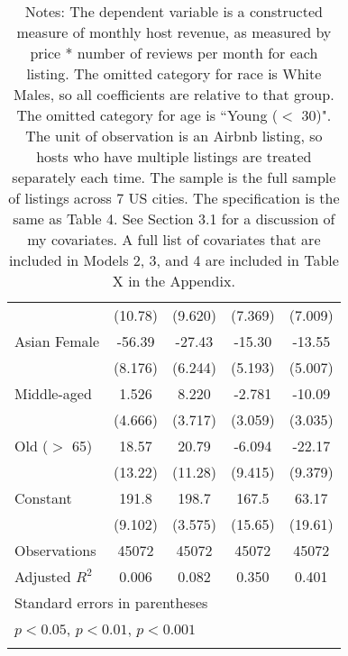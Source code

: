 {\begin{longtable}{l*{4}{c}}
                    &     (10.78)         &     (9.620)         &     (7.369)         &     (7.009)         \\
[1em]
Asian Female        &      -56.39\sym{***}&      -27.43\sym{***}&      -15.30\sym{**} &      -13.55\sym{**} \\
                    &     (8.176)         &     (6.244)         &     (5.193)         &     (5.007)         \\
[1em]
Middle-aged         &       1.526         &       8.220\sym{*}  &      -2.781         &      -10.09\sym{***}\\
                    &     (4.666)         &     (3.717)         &     (3.059)         &     (3.035)         \\
[1em]
Old ($>$ 65)                 &       18.57         &       20.79         &      -6.094         &      -22.17\sym{*}  \\
                    &     (13.22)         &     (11.28)         &     (9.415)         &     (9.379)         \\
[1em]
Constant            &       191.8\sym{***}&       198.7\sym{***}&       167.5\sym{***}&       63.17\sym{**} \\
                    &     (9.102)         &     (3.575)         &     (15.65)         &     (19.61)         \\
\hline
Observations        &       45072         &       45072         &       45072         &       45072         \\
Adjusted \(R^{2}\)  &       0.006         &       0.082         &       0.350         &       0.401         \\
\hline\hline
\multicolumn{5}{l}{\footnotesize Standard errors in parentheses}\\
\multicolumn{5}{l}{\footnotesize \sym{*} \(p<0.05\), \sym{**} \(p<0.01\), \sym{***} \(p<0.001\)}\\
\caption*{Notes: The dependent variable is a constructed measure of monthly host revenue, as measured by price * number of reviews per month for each listing. The omitted category for race is White Males, so all coefficients are relative to that group. The omitted category for age is ``Young ($<$ 30)". The unit of observation is an Airbnb listing, so hosts who have multiple listings are treated separately each time. The sample is the full sample of listings across 7 US cities. The specification is the same as Table 4. See Section 3.1 for a discussion of my covariates. A full list of covariates that are included in Models 2, 3, and 4 are included in Table X in the Appendix.}
\end{longtable}
}

